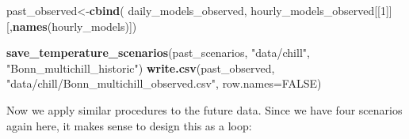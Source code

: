 \documentclass[
]{book}
\newenvironment{Shaded}{\begin{snugshade}}{\end{snugshade}}
\newcommand{\DataTypeTok}[1]{\textcolor[rgb]{0.13,0.29,0.53}{#1}}
\newcommand{\DecValTok}[1]{\textcolor[rgb]{0.00,0.00,0.81}{#1}}
\newcommand{\KeywordTok}[1]{\textcolor[rgb]{0.13,0.29,0.53}{\textbf{#1}}}
\newcommand{\NormalTok}[1]{#1}
\newcommand{\OtherTok}[1]{\textcolor[rgb]{0.56,0.35,0.01}{#1}}
\newcommand{\StringTok}[1]{\textcolor[rgb]{0.31,0.60,0.02}{#1}}
\begin{document}
\begin{Shaded}
\begin{Highlighting}[]
\NormalTok{past_observed<-}\KeywordTok{cbind}\NormalTok{(}
\NormalTok{  daily_models_observed,}
\NormalTok{  hourly_models_observed[[}\DecValTok{1}\NormalTok{]][,}\KeywordTok{names}\NormalTok{(hourly_models)])}

\KeywordTok{save_temperature_scenarios}\NormalTok{(past_scenarios,}
                           \StringTok{"data/chill"}\NormalTok{,}
                           \StringTok{"Bonn_multichill_historic"}\NormalTok{)}
\KeywordTok{write.csv}\NormalTok{(past_observed,}
          \StringTok{"data/chill/Bonn_multichill_observed.csv"}\NormalTok{,}
          \DataTypeTok{row.names=}\OtherTok{FALSE}\NormalTok{)}
\end{Highlighting}
\end{Shaded}

Now we apply similar procedures to the future data. Since we have four scenarios again here, it makes sense to design this as a loop:
\end{document}
